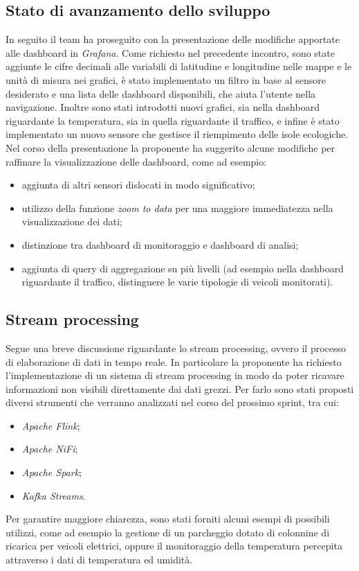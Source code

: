\documentclass[italian,12pt]{article}
\begin{document}
\subsection{Stato di avanzamento dello sviluppo}
In seguito il team ha proseguito con la presentazione delle modifiche apportate alle dashboard in \textit{Grafana}. Come richiesto nel precedente
incontro, sono state aggiunte le cifre decimali alle variabili di latitudine e longitudine nelle mappe e le unità di misura nei grafici,
è stato implementato un filtro in base al sensore desiderato e una lista delle dashboard disponibili, che aiuta l'utente nella navigazione.
Inoltre sono stati introdotti nuovi grafici, sia nella dashboard riguardante la temperatura, sia in quella riguardante il traffico, e infine
è stato implementato un nuovo sensore che gestisce il riempimento delle isole ecologiche. Nel corso della presentazione la proponente ha suggerito
alcune modifiche per raffinare la visualizzazione delle dashboard, come ad esempio:
\begin{itemize}
	\item aggiunta di altri sensori dislocati in modo significativo;
	\item utilizzo della funzione \textit{zoom to data} per una maggiore immediatezza nella visualizzazione dei dati;
	\item distinzione tra dashboard di monitoraggio e dashboard di analisi;
	\item aggiunta di query di aggregazione su più livelli
	(ad esempio nella dashboard riguardante il traffico, distinguere le varie tipologie di veicoli monitorati).
\end{itemize}

\newpage
\subsection{Stream processing}
Segue una breve discussione riguardante lo stream processing, ovvero il processo di elaborazione di dati in tempo reale. In particolare la proponente
ha richiesto l'implementazione di un sistema di stream processing in modo da poter ricavare informazioni non visibili direttamente dai dati grezzi.
Per farlo sono stati proposti diversi strumenti che verranno analizzati nel corso del prossimo sprint, tra cui:
\begin{itemize}
	\item \textit{Apache Flink};
	\item \textit{Apache NiFi};
	\item \textit{Apache Spark};
	\item \textit{Kafka Streams}.
\end{itemize}
Per garantire maggiore chiarezza, sono stati forniti alcuni esempi di possibili utilizzi, come ad esempio la gestione di un parcheggio dotato di
colonnine di ricarica per veicoli elettrici, oppure il monitoraggio della temperatura percepita attraverso i dati di temperatura ed umidità.
\end{document}
